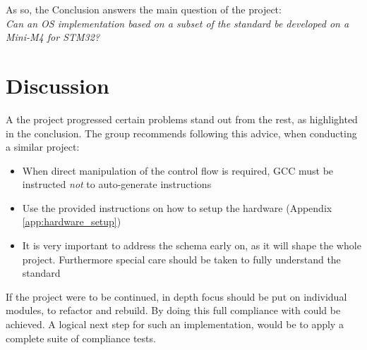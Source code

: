As so, the Conclusion answers the main question of the project:\\
\textit{Can an OS implementation based on a subset of the \arinc{} standard be
developed on a Mini-M4 for STM32?}
\clearpage


\section{Discussion}
A the project progressed certain problems stand out from the rest,
as highlighted in the conclusion.
The group recommends following this advice,
when conducting a similar project:

\begin{itemize}
	\item When direct manipulation of the control flow is required, GCC must be instructed 
	\emph{not} to auto-generate instructions
	\item Use the provided instructions on how to setup the hardware (Appendix \ref{app:hardware_setup})
	\item It is very important to address the schema early on,
		as it will shape the whole project.
		Furthermore special care should be taken to fully understand the \arinc{} standard
\end{itemize}

If the project were to be continued, in depth focus should be put on individual
modules, to refactor and rebuild.
By doing this full compliance with \arinc{} could be achieved.
A logical next step for such an implementation,
would be to apply a complete suite of compliance tests.


%
%


